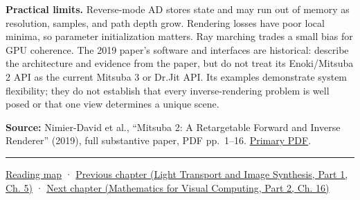 \textbf{Practical limits.} Reverse-mode AD stores state and may run out of memory as resolution, samples, and path depth grow. Rendering losses have poor local minima, so parameter initialization matters. Ray marching trades a small bias for GPU coherence. The 2019 paper's software and interfaces are historical: describe the architecture and evidence from the paper, but do not treat its Enoki/Mitsuba 2 API as the current Mitsuba 3 or Dr.Jit API. Its examples demonstrate system flexibility; they do not establish that every inverse-rendering problem is well posed or that one view determines a unique scene.

\textbf{Source:} Nimier-David et al., ``Mitsuba 2: A Retargetable Forward and Inverse Renderer'' (2019), full substantive paper, PDF pp.~1--16. \href{https://rgl.s3.eu-central-1.amazonaws.com/media/papers/NimierDavidVicini2019Mitsuba2_7.pdf}{Primary PDF}.

\begin{center}\rule{0.5\linewidth}{0.5pt}\end{center}

\hyperref[volume-reading-map]{Reading map} · \href{../04-Light-Transport-and-Image-Synthesis-P01/main.pdf\#nameddest=03-visual-computing-i-ch010-a-production-path-tracer-media-randomness-and-validation}{Previous chapter (Light Transport and Image Synthesis, Part 1, Ch. 5)} · \href{../02-Mathematics-for-Visual-Computing-P02/main.pdf\#nameddest=03-visual-computing-i-ch012-probability-statistics-and-uncertainty}{Next chapter (Mathematics for Visual Computing, Part 2, Ch. 16)}
